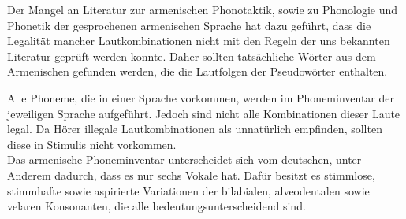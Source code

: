 \documentclass[11pt,a4paper,headsepline,twoside,toc=bibliography]{scrreprt}
\begin{document}
Der Mangel an Literatur zur armenischen Phonotaktik, sowie zu Phonologie und Phonetik der gesprochenen armenischen Sprache hat dazu geführt, dass die Legalität mancher Lautkombinationen nicht mit den Regeln der uns bekannten Literatur geprüft werden konnte. Daher sollten tatsächliche Wörter aus dem Armenischen gefunden werden, die die Lautfolgen der Pseudowörter enthalten. 


Alle Phoneme, die in einer Sprache vorkommen, werden im Phoneminventar der jeweiligen Sprache aufgeführt. Jedoch sind nicht alle Kombinationen dieser Laute legal. Da Hörer illegale Lautkombinationen als unnatürlich empfinden,  sollten diese in Stimulis nicht vorkommen.\\


Das armenische Phoneminventar unterscheidet sich vom deutschen, unter Anderem dadurch, dass es nur sechs Vokale hat. Dafür besitzt es stimmlose, stimmhafte sowie aspirierte Variationen der bilabialen, alveodentalen sowie velaren Konsonanten, die alle bedeutungsunterscheidend sind. 
\end{document}
